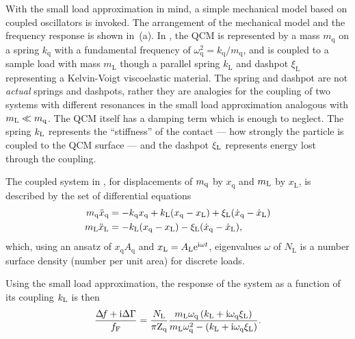 With the small load approximation in mind, a simple mechanical model based
on coupled oscillators is invoked.  The arrangement of the mechanical model
and the frequency response is shown in \,(a).  In
, the QCM is represented by a mass
$m_\mathrm{q}$ on a spring $k_\mathrm{q}$ with a fundamental frequency of
$\omega_\mathrm{q}^2=k_\mathrm{q}/m_\mathrm{q}$, and is coupled to a sample
load with mass $m_\mathrm{L}$ though a parallel spring $k_\mathrm{L}$ and
dashpot $\xi_\mathrm{L}$ representing a Kelvin-Voigt viscoelastic material.
The spring and dashpot are not \textit{actual} springs and dashpots, rather
they are analogies for the coupling of two systems with different
resonances in the small load approximation analogous with $m_\mathrm{L}\ll m_\mathrm{q}$.  The
QCM itself has a damping term which is enough to neglect.  The spring $k_\mathrm{L}$
represents the ``stiffness'' of the contact --- how strongly the particle is
coupled to the QCM surface --- and the dashpot $\xi_\mathrm{L}$ represents energy lost
through the coupling.

The coupled system in , for displacements of
$m_\mathrm{q}$ by $x_\mathrm{q}$ and $m_\mathrm{L}$ by $x_\mathrm{L}$, is described by the
set of differential equations
\begin{align}
 m_\mathrm{q} \ddot{x}_\mathrm{q} &= -k_\mathrm{q} x_\mathrm{q} +k_\mathrm{L} (x_\mathrm{q}-x_\mathrm{L}) + \xi_\mathrm{L} (\dot{x}_\mathrm{q}-\dot{x}_\mathrm{L})\\
 m_\mathrm{L} \ddot{x}_\mathrm{L} &= -k_\mathrm{L} (x_\mathrm{q}-x_\mathrm{L}) - \xi_\mathrm{L} (\dot{x}_\mathrm{q}-\dot{x}_\mathrm{L}),
\end{align}
which, using an ansatz of
$x_\mathrm{q}A_\mathrm{q}$ and $x_\mathrm{L}=A_\mathrm{L}{\mathrm{e}}^{{\mathrm{i}} \omega
t}$,
eigenvalues $\omega$ of
$N_\mathrm{L}$ is a number surface density (number per unit area) for discrete
loads.

Using the small load approximation, the response of the system
as a function of its coupling $k_\mathrm{L}$ is then
\begin{equation}
\frac{\Delta\!f + {\mathrm{i}} \Delta \Gamma}{f_\mathrm{F}} = \frac{N_\mathrm{L}}{\pi
\mathrm{Z}_\mathrm{q}}
\frac{m_\mathrm{L} \omega_\mathrm{q} \left( k_\mathrm{L} + {\mathrm{i}}
\omega_\mathrm{q} \xi_\mathrm{L}\right) }
{m_\mathrm{L} \omega_\mathrm{q}^2 - \left(k_\mathrm{L} + {\mathrm{i}}
\omega_\mathrm{q} \xi_\mathrm{L}\right)}.
\label{eqn:mastereq}
\end{equation}

